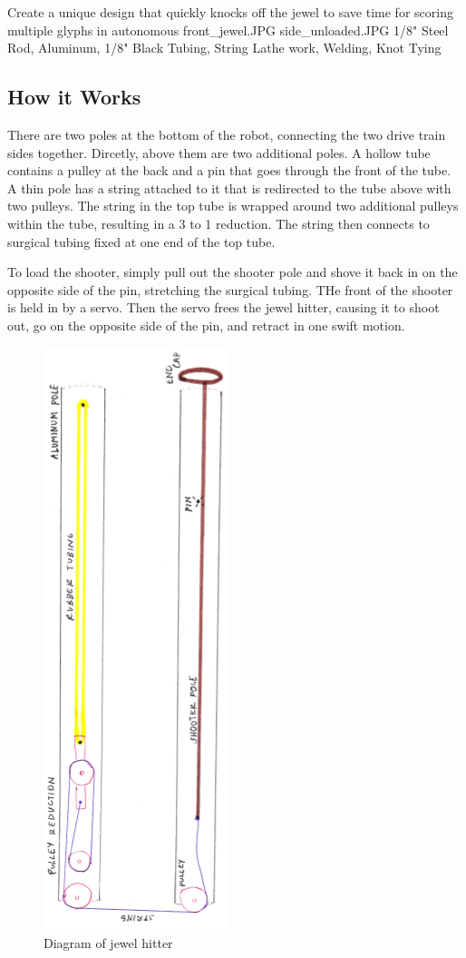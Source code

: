 {Create a unique design that quickly knocks off the jewel to save time for scoring multiple glyphs in autonomous} %
{front_jewel.JPG}%
{side_unloaded.JPG}%
{1/8" Steel Rod, Aluminum, 1/8" Black Tubing, String}%
{Lathe work, Welding, Knot Tying}%

\subsection*{How it Works}
There are two poles at the bottom of the robot, connecting the two drive train sides together. Dircetly, above them are two additional poles.
A hollow tube contains a pulley at the back and a pin that goes through the front of the tube. A thin pole has a string attached to it that is redirected to the tube above with two pulleys. The string in the top tube is wrapped around two additional pulleys within the tube, resulting in a 3 to 1 reduction. The string then connects to surgical tubing fixed at one end of the top tube.

To load the shooter, simply pull out the shooter pole and shove it back in on the opposite side of the pin, stretching the surgical tubing. THe front of the shooter is held in by a servo. Then the servo frees the jewel hitter, causing it to shoot out, go on the opposite side of the pin, and retract in one swift motion. 


\begin{figure}[htp]
\centering
\includegraphics[width=.25\linewidth, angle = 270]{Design_Overview/jewel_hitter_diagram.PNG}
\caption{Diagram of jewel hitter}
\label{fig:Jewel_Dig}
\end{figure}


